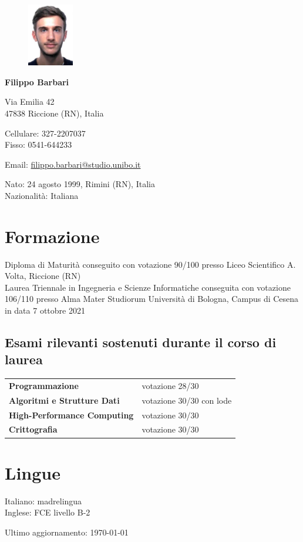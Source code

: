 \documentclass{article}
\newcommand{\years}[1]{\marginnote{\small #1}} %
\begin{document}
	
	\begin{figure}
		\includegraphics[width=0.18\textwidth]{fototessera}
	\end{figure}
		
	{\LARGE\bfseries Filippo Barbari} %
	\bigskip\bigskip\medskip %
	
	Via Emilia 42\\ %
	47838 Riccione (RN), Italia
	\medskip %
	
	Cellulare: 327-2207037\\
	Fisso: 0541-644233
	\medskip
	
	Email: \href{mailto:filippo.barbari@studio.unibo.it}{filippo.barbari@studio.unibo.it}
	\medskip
	
	Nato: 24 agosto 1999, Rimini (RN), Italia\\ %
	Nazionalità: Italiana %
	
	\section*{Formazione}
	
	\years{2013-2018} Diploma di Maturità conseguito con votazione 90/100 presso Liceo Scientifico A. Volta, Riccione (RN)\\
	\years{2018-2021} Laurea Triennale in Ingegneria e Scienze Informatiche conseguita con votazione 106/110 presso Alma Mater Studiorum Università di Bologna, Campus di Cesena in data 7 ottobre 2021
	
	\subsection*{Esami rilevanti sostenuti durante il corso di laurea}
	
	\begin{tabular}{ll}
		\textbf{Programmazione} & votazione 28/30\\
		\textbf{Algoritmi e Strutture Dati} & votazione 30/30 con lode\\
		\textbf{High-Performance Computing} & votazione 30/30\\
		\textbf{Crittografia} & votazione 30/30
	\end{tabular}
	
	\section*{Lingue}
	
	Italiano: madrelingua\\
	Inglese: FCE livello B-2
	
	\vfill
	\begin{center}
		\scriptsize
		Ultimo aggiornamento: \today
	\end{center}
	
\end{document}
